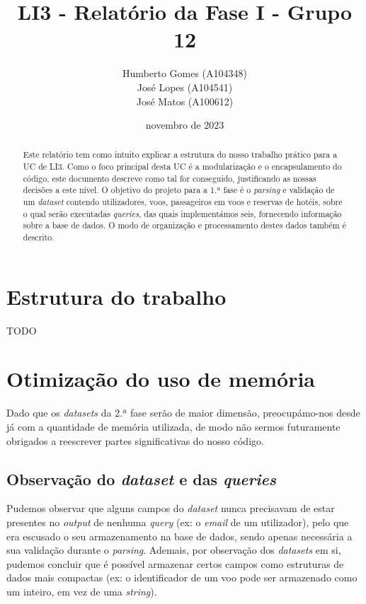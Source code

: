 \documentclass[12pt, a4paper]{article}
\title{\textbf{LI3 - Relatório da Fase I - Grupo 12}}
\author{
	Humberto Gomes (A104348) \\
	José Lopes     (A104541) \\
	José Matos     (A100612) \\
}
\date{novembro de 2023}
\begin{document}
\maketitle
\onehalfspacing
\setlength{\parskip}{\baselineskip}
\setlength{\parindent}{0pt}

\begin{abstract}
    Este relatório tem como intuito explicar a estrutura do nosso trabalho prático para a UC de LI3.
    Como o foco principal desta UC é a modularização e o encapsulamento do código, este documento
    descreve como tal for conseguido, justificando as nossas decisões a este nível. O objetivo do
    projeto para a 1.ª fase é o \emph{parsing} e validação de um \emph{dataset} contendo
    utilizadores, voos, passageiros em voos e reservas de hotéis, sobre o qual serão executadas
    \emph{queries}, das quais implementámos seis, fornecendo informação sobre a base de dados. O
    modo de organização e processamento destes dados também é descrito.
\end{abstract}

\section{Estrutura do trabalho}

TODO

\section{Otimização do uso de memória}

Dado que os \emph{datasets} da 2.ª fase serão de maior dimensão, preocupámo-nos desde já com a
quantidade de memória utilizada, de modo não sermos futuramente obrigados a reescrever partes
significativas do nosso código.

\subsection{Observação do \emph{dataset} e das \emph{queries}}

Pudemos observar que alguns campos do \emph{dataset} nunca precisavam de estar presentes no
\emph{output} de nenhuma \emph{query} (ex: o \emph{email} de um utilizador), pelo que era escusado
o seu armazenamento na base de dados, sendo apenas necessária a sua validação durante o
\emph{parsing}. Ademais, por observação dos \emph{datasets} em si, pudemos concluir que é possível
armazenar certos campos como estruturas de dados mais compactas (ex: o identificador de um voo
pode ser armazenado como um inteiro, em vez de uma \emph{string}).
\end{document}

